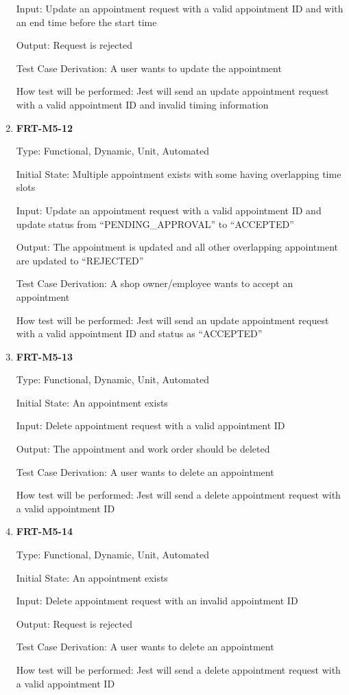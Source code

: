 \documentclass[12pt, titlepage]{article}
\begin{document}
\begin{enumerate}
	      Input: Update an appointment request with a valid appointment ID and with an end time before the
	      start time

	      Output: Request is rejected

	      Test Case Derivation: A user wants to update the appointment

	      How test will be performed: Jest will send an update appointment request with a valid appointment
	      ID and invalid timing information

	\item \textbf{FRT-M5-12}

	      Type: Functional, Dynamic, Unit, Automated

	      Initial State: Multiple appointment exists with some having overlapping time slots

	      Input: Update an appointment request with a valid appointment ID and update status from
	      ``PENDING\_APPROVAL'' to ``ACCEPTED''

	      Output: The appointment is updated and all other overlapping appointment are updated to
	      ``REJECTED''

	      Test Case Derivation: A shop owner/employee wants to accept an appointment

	      How test will be performed: Jest will send an update appointment request with a valid appointment
	      ID and status as ``ACCEPTED''

	\item \textbf{FRT-M5-13}

	      Type: Functional, Dynamic, Unit, Automated

	      Initial State: An appointment exists

	      Input: Delete appointment request with a valid appointment ID

	      Output: The appointment and work order should be deleted

	      Test Case Derivation: A user wants to delete an appointment

	      How test will be performed: Jest will send a delete appointment request with a valid appointment ID

	\item \textbf{FRT-M5-14}

	      Type: Functional, Dynamic, Unit, Automated

	      Initial State: An appointment exists

	      Input: Delete appointment request with an invalid appointment ID

	      Output: Request is rejected

	      Test Case Derivation: A user wants to delete an appointment

	      How test will be performed: Jest will send a delete appointment request with a valid appointment ID

\end{enumerate}
\end{document}
